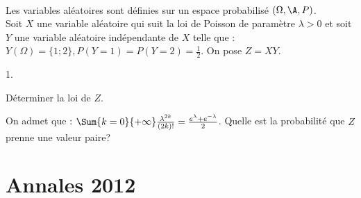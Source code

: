 \documentclass[11pt]{article}%
\begin{document}
\begin{exerciceSP}~\\
  Les variables aléatoires sont définies sur un espace probabilisé
  $(\Omega , \A , P)$. \\ 
  Soit $X$ une variable aléatoire qui suit la loi de Poisson de
  paramètre $\lambda > 0$ et soit $Y$ une variable aléatoire
  indépendante de $X$ telle que : $ Y ( \Omega ) = \{ 1 ; 2 \} , P ( Y
  = 1 ) = P ( Y = 2 ) = \frac{ 1 }{ 2 }$. On pose $Z = X Y$.
  \begin{noliste}{1.}
    \setlength{\itemsep}{2mm}

  \item Déterminer la loi de $Z$.

  \item On admet que : $\Sum{ k = 0 }{ +\infty } \frac{ \lambda^{ 2k }
    }{ (2k)! } = \frac{ e^{ \lambda } + e^{ - \lambda } }{ 2 }
    $. Quelle est la probabilité que $Z$ prenne une valeur paire?

  \end{noliste}
\end{exerciceSP}


\newpage


\section{Annales 2012}
\end{document}
